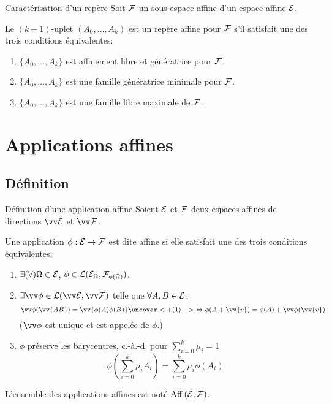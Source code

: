 \documentclass[bigger]{m53beamer}
\begin{document}
  \begin{frame}{Caractérisation d'un repère}
    Soit $\mathcal{F}$ un sous-espace affine d'un espace affine $\mathcal{E}$.
    \begin{proposition}
      Le $(k+1)$-uplet $(A_{0},\ldots,A_{k})$ est un repère affine pour $\mathcal{F}$ s'il satisfait une des trois conditions équivalentes:
      \begin{enumerate}[<+(1)->]
        \item $\{A_{0},\ldots,A_{k}\}$ est affinement libre et génératrice pour $\mathcal{F}$.
        \item $\{A_{0},\ldots,A_{k}\}$ est une famille génératrice minimale pour $\mathcal{F}$.
        \item $\{A_{0},\ldots,A_{k}\}$ est une famille libre maximale de $\mathcal{F}$.
      \end{enumerate}
    \end{proposition}
  \end{frame}
\section{Applications affines}
\subsection{Définition}
  \begin{frame}{Définition d'une application affine}
    Soient $\mathcal{E}$ et $\mathcal{F}$ deux espaces affines de directions $\ev{E}$ et $\ev{F}$.
    \begin{defprop}
      Une application $\phi:\mathcal{E}\rightarrow\mathcal{F}$ est dite \alert{affine} si elle satisfait une des trois conditions équivalentes:
      \begin{enumerate}[<+(1)->]
        \item $\exists(\forall) \Omega \in \mathcal{E}$, $\phi\in\operatorname{\mathcal{L}}(\mathcal{E}_{\Omega},\mathcal{F}_{\phi(\Omega)})$.
        \item $\exists \vv\phi \in \lin(\ev{E},\ev{F})$ telle que $\forall A,B \in \mathcal{E}$,
          $$
            \vv\phi(\vv{AB})=\vv{\phi(A)\phi(B)} \uncover<+(1)->{\Leftrightarrow \phi(A+\vv{v})=\phi(A)+\vv\phi(\vv{v}).}
          $$
        ($\vv\phi$ est unique et est appelée  de $\phi$.)
        \item $\phi$ préserve les barycentres, c.-à.-d. pour $\sum_{i=0}^{k}\mu_{i}=1$
          $$
            \phi(\sum_{i=0}^{k}\mu_{i}A_{i})=\sum_{i=0}^{k}\mu_{i}\phi(A_{i}).
          $$
      \end{enumerate}\pause
      L'ensemble des applications affines est noté $\operatorname{Aff}\left(\mathcal{E},\mathcal{F}\right)$.
    \end{defprop}
  \end{frame}
\end{document}
